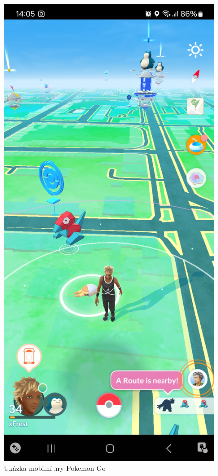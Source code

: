 \begin{figure}[H]
	\centering
	\includegraphics[scale=0.09]{obrazky-figures/PokemonGo.jpg}
	\caption{Ukázka mobilní hry Pokemon Go}
	\label{fig:pogo}
\end{figure}



